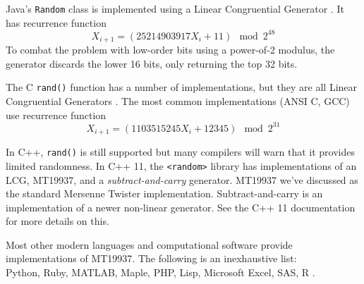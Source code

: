 \documentclass[titlepage]{article}
\theoremstyle{definition}
\begin{document}
Java's \verb|Random| class is implemented using a Linear Congruential Generator \cite{LCGWiki}. It has recurrence function
$$X_{i+1} = (25214903917X_i + 11) \!\!\!\mod 2^{48}$$
To combat the problem with low-order bits using a power-of-2 modulus, the generator discards the lower 16 bits, only returning the top 32 bits.

The C \verb|rand()| function has a number of implementations, but they are all Linear Congruential Generators \cite{LCGWiki}. The most common implementations (ANSI C, GCC) use recurrence function
$$X_{i+1} = (1103515245X_i + 12345) \!\!\!\mod 2^{31}$$

In C++, \verb|rand()| is still supported but many compilers will warn that it provides limited randomness. In C++ 11, the \verb|<random>| library has implementations of an LCG, MT19937, and a \textit{subtract-and-carry} generator. MT19937 we've discussed as the standard Mersenne Twister implementation. Subtract-and-carry is an implementation of a newer non-linear generator. See the C++ 11 documentation for more details on this.

Most other modern languages and computational software provide implementations of MT19937. The following is an inexhaustive list:\\
Python, Ruby, MATLAB, Maple, PHP, Lisp, Microsoft Excel, SAS, R \cite{MTWiki}.


\end{document}

